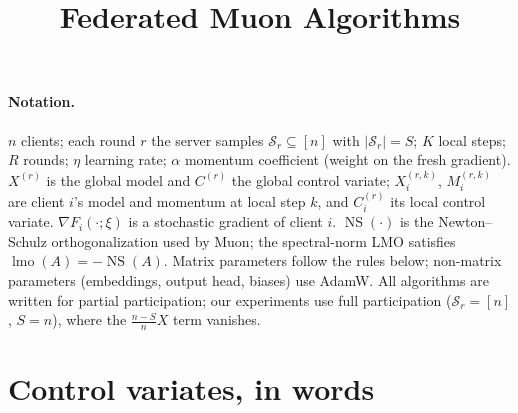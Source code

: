 \documentclass[11pt]{article}
\title{Federated Muon Algorithms}
\author{}
\date{}
\newcommand{\NS}{\operatorname{NS}}
\newcommand{\lmo}{\operatorname{lmo}}
\newcommand{\gF}{\nabla F_i}
\begin{document}
\maketitle
\vspace{-3em}

\paragraph{Notation.}
$n$ clients; each round $r$ the server samples $\mathcal{S}_r\subseteq[n]$ with
$|\mathcal{S}_r|=S$; $K$ local steps; $R$ rounds; $\eta$ learning rate; $\alpha$
momentum coefficient (weight on the fresh gradient). $X^{(r)}$ is the global model
and $C^{(r)}$ the global control variate; $X_i^{(r,k)}$, $M_i^{(r,k)}$ are client
$i$'s model and momentum at local step $k$, and $C_i^{(r)}$ its local control
variate. $\gF(\cdot;\xi)$ is a stochastic gradient of client $i$. $\NS(\cdot)$ is
the Newton--Schulz orthogonalization used by Muon; the spectral-norm LMO satisfies
$\lmo(A)=-\NS(A)$. Matrix parameters follow the rules below; non-matrix parameters
(embeddings, output head, biases) use AdamW. All algorithms are written for partial
participation; our experiments use full participation ($\mathcal{S}_r=[n]$, $S=n$),
where the $\tfrac{n-S}{n}X$ term vanishes.

\section*{Control variates, in words}
\end{document}
